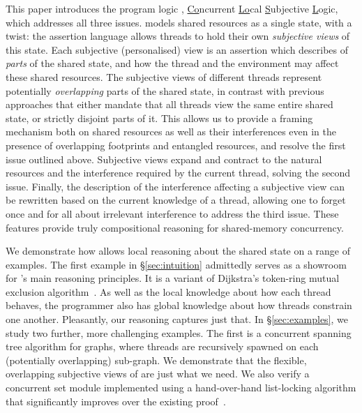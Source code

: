 This paper introduces the program logic \colosl,
\underline{Co}ncurrent \underline{Lo}cal \underline{S}ubjective
\underline{L}ogic, which addresses all three issues. \colosl models
shared resources as a single state, with a twist: the assertion
language allows threads to hold their own \emph{subjective views} of
this state. Each subjective (personalised) view is an assertion which
describes of \emph{parts} of the shared state, and how the thread and
the environment may affect these shared resources.  The subjective
views of different threads represent potentially \emph{overlapping}
parts of the shared state, in contrast with previous approaches that
either mandate that all threads view the same entire shared state, or
strictly disjoint parts of it. This allows us to provide a framing
mechanism both on shared resources as well as their interferences even
in the presence of overlapping footprints and entangled resources, and
resolve the first issue outlined above. Subjective views expand and
contract to the natural resources and the interference required by the
current thread, solving the second issue. Finally, the description of
the interference affecting a subjective view can be rewritten based on
the current knowledge of a thread, allowing one to forget once and for
all about irrelevant interference to address the third issue. These
features provide truly compositional reasoning for shared-memory
concurrency.




 We demonstrate how
\colosl allows local reasoning about the shared state on a range of
examples.  The first example in \S\ref{sec:intuition} admittedly
serves as a showroom for \colosl's main reasoning principles. It is a
variant of Dijkstra's token-ring mutual exclusion
algorithm~\cite{dijkstra74}. As well as the local knowledge about how
each thread behaves, the programmer also has global knowledge about
how threads constrain one another. Pleasantly, our reasoning captures
just that. In \S\ref{sec:examples}, we study two further, more
challenging examples. The first is a concurrent spanning tree
algorithm for graphs, where threads are recursively spawned on each
(potentially overlapping) sub-graph. We demonstrate that the flexible,
overlapping subjective views of \colosl are just what we need.  We
also verify a concurrent set module implemented using a hand-over-hand
list-locking algorithm that significantly improves over the existing
proof~\cite{cap-ecoop10}.
%


